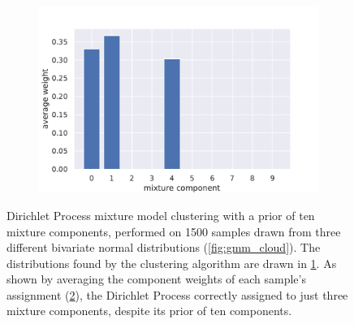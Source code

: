 \begin{figure}[tbp]
\begin{subfigure}[b]{0.49\textwidth}
    \caption{\label{fig:gmm_dist}}
  \end{subfigure}
  \begin{subfigure}[b]{0.75\textwidth}
    \includegraphics[width=\textwidth]{figures/gmm_assignments.pdf}
    \caption{\label{fig:gmm_ass}}
  \end{subfigure}
  \caption{Dirichlet Process mixture model clustering with a prior of ten mixture
    components, performed on 1500 samples drawn from three different bivariate
    normal distributions (\cref{fig:gmm_cloud}). The distributions found by the
    clustering algorithm are drawn in \cref{fig:gmm_dist}. As shown by averaging
    the component weights of each sample's assignment (\cref{fig:gmm_ass}), the
    Dirichlet Process correctly assigned to just three mixture components,
  despite its prior of ten components.\label{fig:gmm_example}}
\end{figure}

